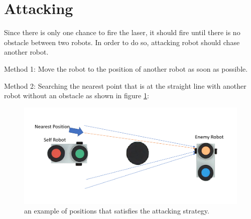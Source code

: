 \section{Attacking}
Since there is only one chance to fire the laser, it should fire until there is no obstacle between two robots. In order to do so, attacking robot should chase another robot. 

Method 1:
Move the robot to the position of another robot as soon as possible.

Method 2:
Searching the nearest point that is at the straight line with another robot without an obstacle as shown in figure \ref{attacking_method2}:

\begin{figure}[thb]
    \centering
    \includegraphics[width=1\textwidth]{images/attacking_method2.png}
    \caption[attacking method]{an example of positions that satisfies the attacking strategy.}\label{attacking_method2}
\end{figure}
